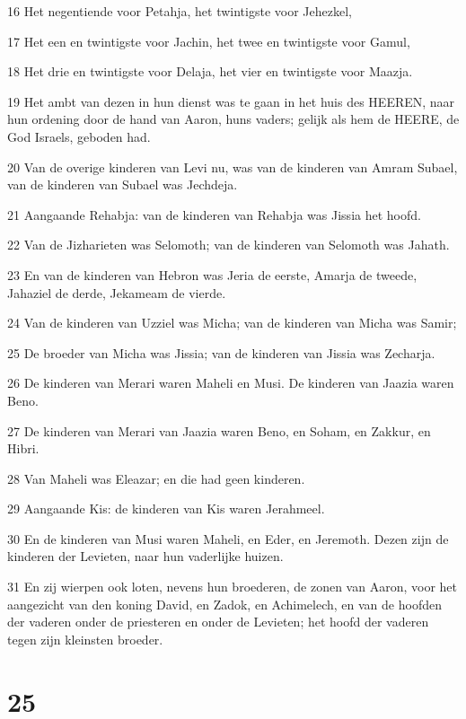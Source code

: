 \par 16 Het negentiende voor Petahja, het twintigste voor Jehezkel,
\par 17 Het een en twintigste voor Jachin, het twee en twintigste voor Gamul,
\par 18 Het drie en twintigste voor Delaja, het vier en twintigste voor Maazja.
\par 19 Het ambt van dezen in hun dienst was te gaan in het huis des HEEREN, naar hun ordening door de hand van Aaron, huns vaders; gelijk als hem de HEERE, de God Israels, geboden had.
\par 20 Van de overige kinderen van Levi nu, was van de kinderen van Amram Subael, van de kinderen van Subael was Jechdeja.
\par 21 Aangaande Rehabja: van de kinderen van Rehabja was Jissia het hoofd.
\par 22 Van de Jizharieten was Selomoth; van de kinderen van Selomoth was Jahath.
\par 23 En van de kinderen van Hebron was Jeria de eerste, Amarja de tweede, Jahaziel de derde, Jekameam de vierde.
\par 24 Van de kinderen van Uzziel was Micha; van de kinderen van Micha was Samir;
\par 25 De broeder van Micha was Jissia; van de kinderen van Jissia was Zecharja.
\par 26 De kinderen van Merari waren Maheli en Musi. De kinderen van Jaazia waren Beno.
\par 27 De kinderen van Merari van Jaazia waren Beno, en Soham, en Zakkur, en Hibri.
\par 28 Van Maheli was Eleazar; en die had geen kinderen.
\par 29 Aangaande Kis: de kinderen van Kis waren Jerahmeel.
\par 30 En de kinderen van Musi waren Maheli, en Eder, en Jeremoth. Dezen zijn de kinderen der Levieten, naar hun vaderlijke huizen.
\par 31 En zij wierpen ook loten, nevens hun broederen, de zonen van Aaron, voor het aangezicht van den koning David, en Zadok, en Achimelech, en van de hoofden der vaderen onder de priesteren en onder de Levieten; het hoofd der vaderen tegen zijn kleinsten broeder.

\chapter{25}

